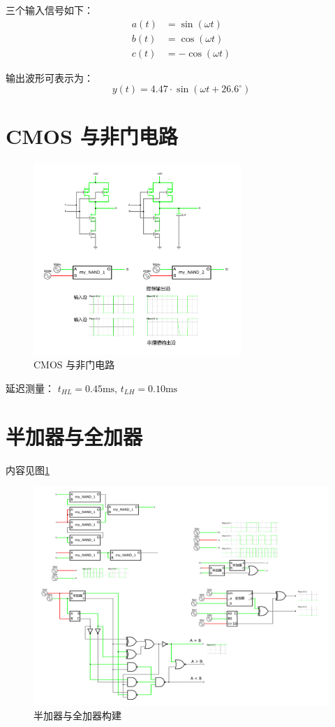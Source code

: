 \documentclass{article}
\begin{document}
三个输入信号如下：
\[
\begin{aligned}
a(t) &= \sin(\omega t) \\
b(t) &= \cos(\omega t) \\
c(t) &= -\cos(\omega t)
\end{aligned}
\]

输出波形可表示为：
\[
y(t) = 4.47 \cdot \sin(\omega t + 26.6^\circ)
\]


\section{CMOS 与非门电路}

\begin{figure}[htbp]
    \centering
    \includegraphics[width=0.7\textwidth]{NAND.pdf}
    \caption{CMOS 与非门电路}
\end{figure}

延迟测量： $t_{HL} = 0.45 \mathrm{ms}$, $t_{LH} = 0.10 \mathrm{ms}$

\section{半加器与全加器}

内容见图\ref{fig:banjiaqiyuquanjiaqi}

\begin{figure}[htbp]
    \centering
    \includegraphics[width=1\textwidth]{半加器与全加器.pdf}
    \caption{半加器与全加器构建}
    \label{fig:banjiaqiyuquanjiaqi}
\end{figure}
\end{document}
